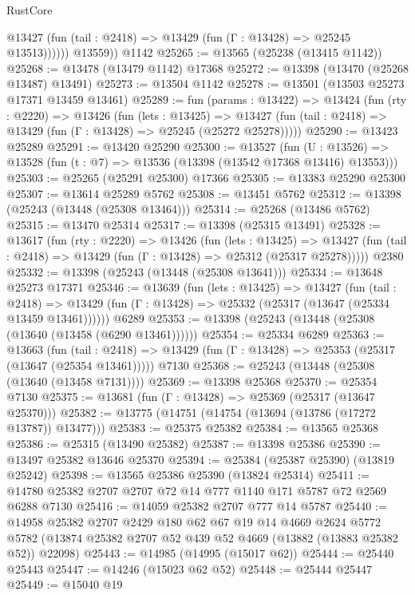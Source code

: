 \begin{lexlean}{RustCore}
\begin{coremodule}
              @13427 (fun (tail : @2418) => @13429 (fun (Γ : @13428) => @25245 @13513))))))
        @13559))
    @1142
@25265 := @13565 (@25238 (@13415 @1142))
@25268 := @13478 (@13479 @1142) @17368
@25272 := @13398 (@13470 (@25268 @13487) @13491)
@25273 := @13504 @1142
@25278 := @13501 (@13503 @25273 @17371 @13459 @13461)
@25289 := fun (params : @13422) =>
  @13424
    (fun (rty : @2220) =>
    @13426
      (fun (lets : @13425) =>
      @13427 (fun (tail : @2418) => @13429 (fun (Γ : @13428) => @25245 (@25272 @25278)))))
@25290 := @13423 @25289
@25291 := @13420 @25290
@25300 := @13527
    (fun (U : @13526) => @13528 (fun (t : @7) => @13536 (@13398 (@13542 @17368 @13416) @13553)))
@25303 := @25265 (@25291 @25300) @17366
@25305 := @13383 @25290 @25300
@25307 := @13614 @25289 @5762
@25308 := @13451 @5762
@25312 := @13398 (@25243 (@13448 (@25308 @13464)))
@25314 := @25268 (@13486 @5762)
@25315 := @13470 @25314
@25317 := @13398 (@25315 @13491)
@25328 := @13617
    (fun (rty : @2220) =>
    @13426
      (fun (lets : @13425) =>
      @13427 (fun (tail : @2418) => @13429 (fun (Γ : @13428) => @25312 (@25317 @25278)))))
    @2380
@25332 := @13398 (@25243 (@13448 (@25308 @13641)))
@25334 := @13648 @25273 @17371
@25346 := @13639
    (fun (lets : @13425) =>
    @13427
      (fun (tail : @2418) =>
      @13429 (fun (Γ : @13428) => @25332 (@25317 (@13647 (@25334 @13459 @13461))))))
    @6289
@25353 := @13398 (@25243 (@13448 (@25308 (@13640 (@13458 (@6290 @13461))))))
@25354 := @25334 @6289
@25363 := @13663
    (fun (tail : @2418) => @13429 (fun (Γ : @13428) => @25353 (@25317 (@13647 (@25354 @13461)))))
    @7130
@25368 := @25243 (@13448 (@25308 (@13640 (@13458 @7131))))
@25369 := @13398 @25368
@25370 := @25354 @7130
@25375 := @13681 (fun (Γ : @13428) => @25369 (@25317 (@13647 @25370)))
@25382 := @13775 (@14751 (@14754 (@13694 (@13786 (@17272 @13787)) @13477)))
@25383 := @25375 @25382
@25384 := @13565 @25368
@25386 := @25315 (@13490 @25382)
@25387 := @13398 @25386
@25390 := @13497 @25382 @13646 @25370
@25394 := @25384 (@25387 @25390) (@13819 @25242)
@25398 := @13565 @25386 @25390 (@13824 @25314)
@25411 := @14780 @25382 @2707 @2707 @72 @14 @777 @1140 @171 @5787 @72 @2569 @6288 @7130
@25416 := @14059 @25382 @2707 @777 @14 @5787
@25440 := @14958
    @25382
    @2707
    @2429
    @180
    @62
    @67
    @19
    @14
    @4669
    @2624
    @5772
    @5782
    (@13874 @25382 @2707 @52 @439 @52 @4669 (@13882 (@13883 @25382 @52)) @22098)
@25443 := @14985 (@14995 (@15017 @62))
@25444 := @25440 @25443
@25447 := @14246 (@15023 @62 @52)
@25448 := @25444 @25447
@25449 := @15040 @19

\end{coremodule}
\end{lexlean}
